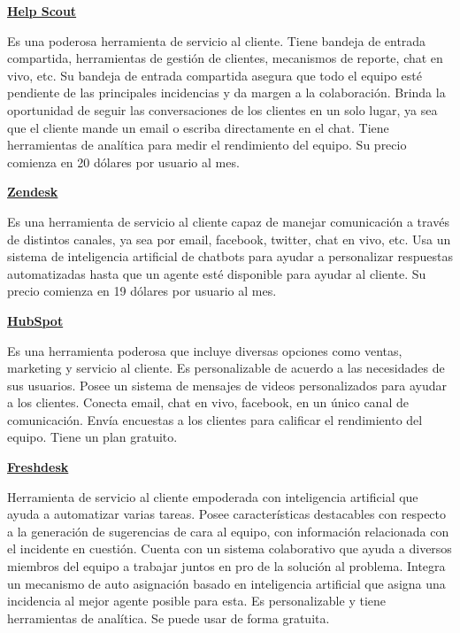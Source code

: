 \textbf{\href{https://www.helpscout.com/}{Help Scout}}
\newline

Es una poderosa herramienta de servicio al cliente. Tiene bandeja de entrada compartida, herramientas de gestión de clientes, mecanismos de reporte, chat en vivo, etc. Su bandeja de entrada compartida asegura que todo el equipo esté pendiente de las principales incidencias y da margen a la colaboración. Brinda la oportunidad de seguir las conversaciones de los clientes en un solo lugar, ya sea que el cliente mande un email o escriba directamente en el chat. Tiene herramientas de analítica para medir el rendimiento del equipo. Su precio comienza en 20 dólares por usuario al mes.
\newline

\textbf{\href{https://www.zendesk.com/}{Zendesk}}
\newline

Es una herramienta de servicio al cliente capaz de manejar comunicación a través de distintos canales, ya sea por email, facebook, twitter, chat en vivo, etc. Usa un sistema de inteligencia artificial de chatbots para ayudar a personalizar respuestas automatizadas hasta que un agente esté disponible para ayudar al cliente. Su precio comienza en 19 dólares por usuario al mes.
\newline

\textbf{\href{https://www.hubspot.com/}{HubSpot}}
\newline

Es una herramienta poderosa que incluye diversas opciones como ventas, marketing y servicio al cliente. Es personalizable de acuerdo a las necesidades de sus usuarios. Posee un sistema de mensajes de videos personalizados para ayudar a los clientes. Conecta email, chat en vivo, facebook, en un único canal de comunicación. Envía encuestas a los clientes para calificar el rendimiento del equipo. Tiene un plan gratuito.
\newline

\textbf{\href{https://freshdesk.com/}{Freshdesk}}
\newline

Herramienta de servicio al cliente empoderada con inteligencia artificial que ayuda a automatizar varias tareas. Posee características destacables con respecto a la generación de sugerencias de cara al equipo, con información relacionada con el incidente en cuestión. Cuenta con un sistema colaborativo que ayuda a diversos miembros del equipo a trabajar juntos en pro de la solución al problema. Integra un mecanismo de auto asignación basado en inteligencia artificial que asigna una incidencia al mejor agente posible para esta. Es personalizable y tiene herramientas de analítica. Se puede usar de forma gratuita.
\newline

